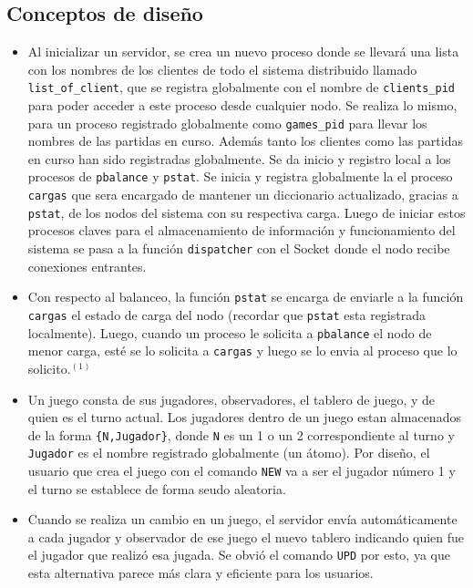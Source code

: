 \documentclass[a4paper]{article}
\newcommand{\blacktr}[0]{\item[$\blacktriangleright$]}
\begin{document}
\subsection*{Conceptos de diseño}
\begin{itemize}
  \blacktr Al inicializar un servidor, se crea un nuevo proceso donde se llevará una lista con los nombres de los clientes de todo el sistema distribuido llamado \texttt{list_of_client}, que se registra globalmente con el nombre de \texttt{clients_pid} para poder acceder a este proceso desde cualquier nodo. Se realiza lo mismo, para un proceso registrado globalmente como \texttt{games_pid} para llevar los nombres de las partidas en curso. Además tanto los clientes como las partidas en curso han sido registradas globalmente. Se da inicio y registro local a los procesos de \texttt{pbalance} y \texttt{pstat}. Se inicia y registra globalmente la el proceso \texttt{cargas} que sera encargado de mantener un diccionario actualizado, gracias a \texttt{pstat}, de los nodos del sistema con su respectiva carga. Luego de iniciar estos procesos claves para el almacenamiento de información y funcionamiento del sistema se pasa a la función \texttt{dispatcher} con el Socket donde el nodo recibe conexiones entrantes.

  \blacktr Con respecto al balanceo, la función \texttt{pstat} se encarga de enviarle a la función \texttt{cargas} el estado de carga del nodo (recordar que \texttt{pstat} esta registrada localmente). Luego, cuando un proceso le solicita a \texttt{pbalance} el nodo de menor carga, esté se lo solicita a \texttt{cargas} y luego se lo envia al proceso que lo solicito.$^{(1)}$ 

  \blacktr Un juego consta de sus jugadores, observadores, el tablero de juego, y de quien es el turno actual. Los jugadores dentro de un juego estan almacenados de la forma \texttt{\{N,Jugador\}}, donde \texttt{N} es un 1 o un 2 correspondiente al turno y \texttt{Jugador} es el nombre registrado globalmente (un átomo). Por diseño, el usuario que crea el juego con el comando \texttt{NEW} va a ser el jugador número 1 y el turno se establece de forma seudo aleatoria.

  \blacktr Cuando se realiza un cambio en un juego, el servidor envía automáticamente a cada jugador y observador de ese juego el nuevo tablero indicando quien fue el jugador que realizó esa jugada. Se obvió el comando \texttt{UPD} por esto, ya que esta alternativa parece más clara y eficiente para los usuarios. 
\end{itemize}
\end{document}
